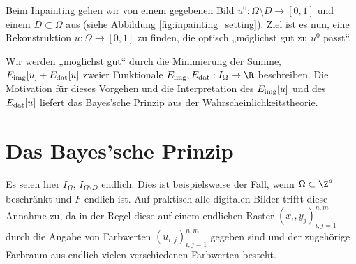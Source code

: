 \documentclass{mythesis}
\begin{document}
Beim Inpainting gehen wir von einem gegebenen Bild $u^0: \Omega \setminus D \to [0,1]$ und einem 
$D \subset \Omega$ aus (siehe Abbildung \ref{fig:inpainting_setting}). Ziel ist es nun, eine Rekonstruktion $u: \Omega \to [0,1]$ zu finden, die optisch „möglichst gut zu $u^0$ passt“.

Wir werden „möglichst gut“ durch die Minimierung der Summe,
\begin{math}
    E_{\mathrm{img}}[u] + E_{\mathrm{dat}}[u]
\end{math}
zweier Funktionale $\Eimg, \Edat: I_\Omega \to \R$ beschreiben.
Die Motivation für dieses Vorgehen und die Interpretation des  $E_{\mathrm{img}}[u]$ und des  $E_{\mathrm{dat}}[u]$ liefert das Bayes'sche Prinzip \cite{chan2005variational,mumford1994bayesian} aus der Wahrscheinlichkeitstheorie.

%
%

\section{Das Bayes'sche Prinzip}


Es seien hier $I_\Omega$, $I_{\Omega \setminus D}$ endlich.
Dies ist beispielsweise der Fall, wenn $\Omega \subset \Z^d$ beschränkt und $F$ endlich ist.
Auf praktisch alle digitalen Bilder triftt diese Annahme zu, da in der Regel diese auf einem endlichen Raster $(x_i, y_j)_{i,j=1}^{n,m}$ durch die Angabe von Farbwerten $(u_{i,j})_{i,j=1}^{n,m}$ gegeben sind und der zugehörige Farbraum aus endlich vielen verschiedenen Farbwerten besteht.
\end{document}
